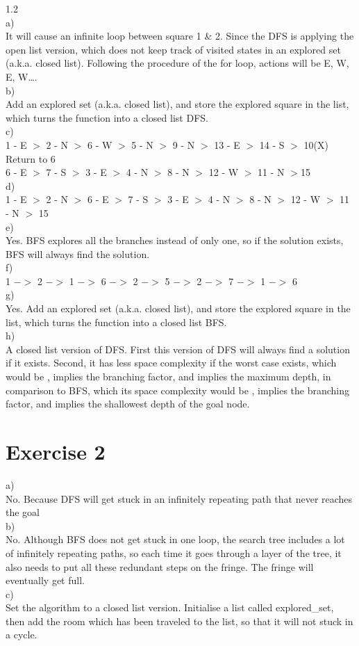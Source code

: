 \documentclass{article}
\begin{document}
1.2
\\
a) 
\\
It will cause an infinite loop between square 1 \& 2. Since the DFS is applying the open list version, which does not keep track of visited states in an explored set (a.k.a. closed list). Following the procedure of the for loop, actions will be E, W, E, W….
\\
b) 
\\
Add an explored set (a.k.a. closed list), and store the explored square in the list, which turns the function into a closed list DFS. 
\\
c)
\\
1 - E $>$ 2 - N $>$ 6 - W $>$ 5 - N $>$ 9 - N $>$ 13 - E $>$ 14 - S $>$ 10(X)
\\
Return to 6
\\
6 - E $>$ 7 - S $>$ 3 - E $>$ 4 - N $>$ 8 - N $>$ 12 - W $>$ 11 - N $>$15 
\\
d)
\\
1 - E $>$ 2 - N $>$ 6 - E $>$ 7 - S $>$ 3 - E $>$ 4 - N $>$ 8 - N $>$ 12 - W $>$ 11 - N $>$ 15
\\
e)
\\
Yes. BFS explores all the branches instead of only one, so if the solution exists, BFS will always find the solution. 
\\
f)
\\
1 $->$ 2 $->$ 1 $->$ 6 $->$ 2 $->$ 5 $->$ 2 $->$ 7 $->$ 1 $->$ 6
\\
g)
\\
Yes. Add an explored set (a.k.a. closed list), and store the explored square in the list, which turns the function into a closed list BFS.
\\
h)
\\
A closed list version of DFS. First this version of DFS will always find a solution if it exists. Second, it has less space complexity if the worst case exists, which would be , implies the branching factor, and  implies the maximum depth, in comparison to BFS, which its space complexity would be ,  implies the branching factor, and  implies the shallowest depth of the goal node. 
\\



\section*{Exercise 2}
a)
\\
No. Because DFS will get stuck in an infinitely repeating path that never reaches the goal
\\
b)
\\
No. Although BFS does not get stuck in one loop, the search tree includes a lot of infinitely repeating paths, so each time it goes through a layer of the tree, it also needs to put all these redundant steps on the fringe. The fringe will eventually get full. 
\\
c)
\\
Set the algorithm to a closed list version. Initialise a list called explored\_set, then add the room which has been traveled to the list, so that it will not stuck in a cycle.
\end{document}
